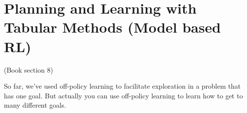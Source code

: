 \documentclass[12pt, a4paper]{article}
\let\stdsection\section
\renewcommand\section{\newpage\stdsection} %
\begin{document}
\section{Planning and Learning with Tabular Methods (Model based RL)}

(Book section 8)

So far, we’ve used off-policy learning to facilitate exploration in a problem that has one goal. But actually you can use off-policy learning to learn how to get to many different goals.
\end{document}
